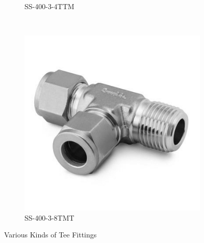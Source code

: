 \documentclass[a4paper,12pt,oneside]{article}
\begin{document}
\begin{appendices}
\begin{figure}[H]
\begin{subfigure}[b]{0.21\textwidth}
    \caption{SS-400-3-4TTM}
    \end{subfigure}
    ~
    \begin{subfigure}[b]{0.21\textwidth}
    \centering
    \includegraphics[width=\textwidth]{appendix/img/interfaces/SS-400-3-8TMT.jpg}
    \caption{SS-400-3-8TMT}
    \end{subfigure}
    \caption{Various Kinds of Tee Fittings}
    \label{Appx:Tee_fittings}
\end{figure}



\end{appendices}
\end{document}
